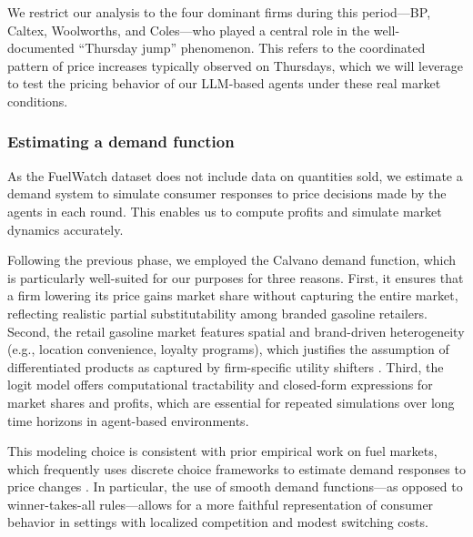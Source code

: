 We restrict our analysis to the four dominant firms during this period---BP, Caltex, Woolworths, and Coles---who played a central role in the well-documented ``Thursday jump” phenomenon. This refers to the coordinated pattern of price increases typically observed on Thursdays, which we will leverage to test the pricing behavior of our LLM-based agents under these real market conditions.

\subsubsection*{Estimating a demand function}

As the FuelWatch dataset does not include data on quantities sold, we estimate a demand system to simulate consumer responses to price decisions made by the agents in each round. This enables us to compute profits and simulate market dynamics accurately.

Following the previous phase, we employed the Calvano demand function, which is particularly well-suited for our purposes for three reasons. First, it ensures that a firm lowering its price gains market share without capturing the entire market, reflecting realistic partial substitutability among branded gasoline retailers. Second, the retail gasoline market features spatial and brand-driven heterogeneity (e.g., location convenience, loyalty programs), which justifies the assumption of differentiated products as captured by firm-specific utility shifters \parencite{hastings_vertical_2004}. Third, the logit model offers computational tractability and closed-form expressions for market shares and profits, which are essential for repeated simulations over long time horizons in agent-based environments.

This modeling choice is consistent with prior empirical work on fuel markets, which frequently uses discrete choice frameworks to estimate demand responses to price changes \parencite{hastings_fungibility_2013, houde_spatial_2012}. In particular, the use of smooth demand functions---as opposed to winner-takes-all rules---allows for a more faithful representation of consumer behavior in settings with localized competition and modest switching costs.



